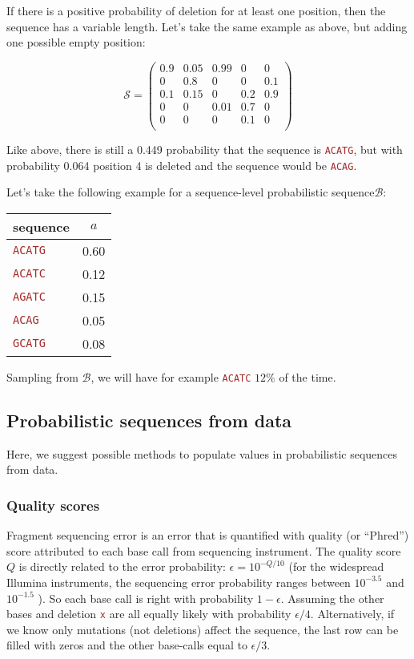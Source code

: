 \documentclass[10pt]{article}
\newcommand{\sq}[1]{\texttt{\textcolor{brown}{#1}}}
\newcommand{\sps}{\mathcal{B}} %
\newcommand{\nps}{\mathcal{S}} %
\newcommand{\slps}{sequence-level probabilistic sequence\xspace}
\begin{document}
If there is a positive probability of deletion for at least one position, then the sequence has a variable length. 
Let's take the same example as above, but adding one possible empty position:

$$
\nps = 
\begin{pmatrix}
0.9 & 0.05   & 0.99 & 0 & 0\\
0   & 0.8 & 0 & 0 & 0.1\\
0.1 & 0.15 & 0 & 0.2 & 0.9\\
0 & 0 & 0.01 & 0.7 & 0\\
0 & 0 & 0 & 0.1 & 0\\
\end{pmatrix}
$$

\noindent Like above, there is still a 0.449 probability that the sequence is \sq{ACATG}, but with probability 0.064 position 4 is deleted and the sequence would be \sq{ACAG}.

Let's take the following example for a \slps $\sps$:
\begin{table}[H]
\begin{center}
\begin{tabular}{lc}
\hline
sequence & $a$ \\
\hline
\sq{ACATG} & 0.60 \\
\sq{ACATC} & 0.12 \\
\sq{AGATC} & 0.15 \\
\sq{ACAG}  & 0.05 \\
\sq{GCATG} & 0.08 \\
\hline
\end{tabular}
\end{center}
\label{default}
\end{table}%
Sampling from $\sps$, we will have for example \sq{ACATC} $12\%$ of the time. 


\subsection{Probabilistic sequences from data}

Here, we suggest possible methods to populate values in probabilistic sequences from data. 

\subsubsection{Quality scores}
Fragment sequencing error is an error that is quantified with quality (or ``Phred'') score attributed to each base call from sequencing instrument. 
The quality score $Q$ is directly related to the error probability: $\epsilon = 10^{-Q/10}$ \cite{xxx} (for the widespread Illumina instruments, the sequencing error probability ranges between $10^{-3.5}$ and  $10^{-1.5}$ \cite{xxx}).  
So each base call is right with probability $1-\epsilon$. Assuming the other bases and deletion \sq{x} are all equally likely with probability $\epsilon/4$. Alternatively, if we know only mutations (not deletions) affect the sequence, the last row can be filled with zeros and the other base-calls equal to $\epsilon/3$.
\end{document}
